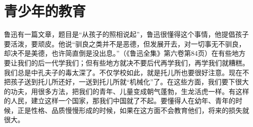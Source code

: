 \section[青少年的教育（一九五三年）]{青少年的教育}


鲁迅有一篇文章，题目是“从孩子的照相说起”，鲁迅很懂得这个事情，他提倡孩子要活泼，要顽皮。他说“驯良之类并不是恶德，但发展开去，对一切事无不驯良，却决不是美德，也许简直倒是没出息。”（《鲁迅全集》第六卷第84页）在有些地方要让我们的后一代学我们；但有些地方就决不要后代再学我们，再学我们就糟糕。我们总是中孔夫子的毒太深了。不仅学校如此，就是托儿所也要很好注意。现在不把孩子送到托儿所还好，一送到托儿所就“机械化”了。在这些方面，我们要下很大的功夫，用很多方法，把我们的青年、儿量变成朝气蓬勃，生龙活虎一样。有这样的人民，建立这样一个国家，那我们中国就了不起。要懂得人在幼年、青年的时候，正是性格、品质慢慢形成的时候，如果在这方面不会教育他们，将来的损失就很大。


